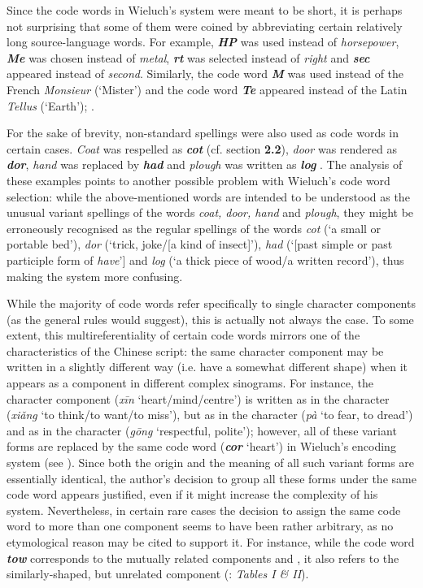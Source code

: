 \documentclass[output=paper,colorlinks,citecolor=brown,arabicfont,chinesefont]{langscibook}
\begin{document}
Since the code words in Wieluch's system were meant to be short, it is perhaps not surprising that some of them were coined by abbreviating certain relatively long source-language words. For example, \textbf{\emph{HP}} was used instead of \emph{horsepower}, \textbf{\emph{Me}} was chosen instead of \emph{metal}, \textbf{\emph{rt}} was selected instead of \emph{right} and \textbf{\emph{sec}} appeared instead of \emph{second}. Similarly, the code word \textbf{\emph{M}} was used instead of the French \emph{Monsieur} (‘Mister’) and the code word \textbf{\emph{Te}} appeared instead of the Latin \emph{Tellus} (‘Earth’); \citep[4-8\textsubscript{p}]{Wieluch1936}.

For the sake of brevity, non-standard spellings were also used as code words in certain cases. \emph{Coat} was respelled as \textbf{\emph{cot}} (cf. section \textbf{2.2}), \emph{door} was rendered as \textbf{\emph{dor}}, \emph{hand} was replaced by \textbf{\emph{had}} and \emph{plough} was written as \textbf{\emph{log}} \citep[4-5 :\textsubscript{p}]{Wieluch1936}. The analysis of these examples points to another possible problem with Wieluch's code word selection: while the above-mentioned words are intended to be understood as the unusual variant spellings of the words \emph{coat, door, hand} and \emph{plough}, they might be erroneously recognised as the regular spellings of the words \emph{cot} (‘a small or portable bed’), \emph{dor} (‘trick, joke/[a kind of insect]'), \emph{had} (‘[past simple or past participle form of \emph{have}'] and \emph{log} (‘a thick piece of wood/a written record’), thus making the system more confusing.

While the majority of code words refer specifically to single character components (as the general rules would suggest), this is actually not always the case. To some extent, this multireferentiality of certain code words mirrors one of the characteristics of the Chinese script: the same character component may be written in a slightly different way (i.e. have a somewhat different shape) when it appears as a component in different complex sinograms. For instance, the character component {} (\emph{xīn} ‘heart/mind/centre’) is written as {} in the character {} (\emph{xiǎng} ‘to think/to want/to miss’), but as {}in the character {} (\emph{pà} ‘to fear, to dread’) and as {} in the character {} (\emph{gōng} ‘respectful, polite’); however, all of these variant forms are replaced by the same code word (\textbf{\emph{cor}} ‘heart’) in Wieluch's encoding system (see ). Since both the origin and the meaning of all such variant forms are essentially identical, the author's decision to group all these forms under the same code word appears justified, even if it might increase the complexity of his system. Nevertheless, in certain rare cases the decision to assign the same code word to more than one component seems to have been rather arbitrary, as no etymological reason may be cited to support it. For instance, while the code word \textbf{\emph{tow}} corresponds to the mutually related components {} and {}, it also refers to the similarly-shaped, but unrelated component {} (\citealt{Wieluch1936}: \emph{Tables I \& II}).
\end{document}
